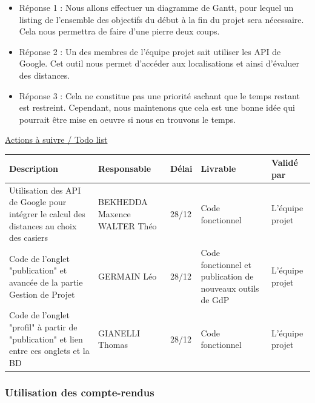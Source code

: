 \documentclass[11pt]{article}
\begin{document}
\begin{itemize}
	\item  Réponse 1 : Nous allons effectuer un diagramme de Gantt, pour lequel un listing de l'ensemble des objectifs du début à la fin du projet sera nécessaire. Cela nous permettra de faire d'une pierre deux coups.
    \item	Réponse 2 : Un des membres de l'équipe projet sait utiliser les API de Google. Cet outil nous permet d'accéder aux localisations et ainsi d'évaluer des distances. 
    \item	Réponse 3 : Cela ne constitue pas une priorité sachant que le temps restant est restreint. Cependant, nous maintenons que cela est une bonne idée qui pourrait être mise en oeuvre si nous en trouvons le temps.

\end{itemize}
\vspace{0.5cm}


\underline{Actions à suivre / Todo list}
\vspace{0.2cm}

\begin{center}
\begin{tabular}{|p{4cm}|p{4cm}|p{1cm}|p{3cm}|p{2cm}|}
\hline
\centering Description & 
\centering Responsable & 
\centering Délai & 
\centering Livrable & 
\hspace{0.05cm} Validé par\\
\hline
Utilisation des API de Google pour intégrer le calcul des distances au choix des casiers & BEKHEDDA Maxence \newline WALTER Théo & 28/12 & Code fonctionnel & L'équipe projet \\
\hline
Code de l'onglet "publication" et avancée de la partie Gestion de Projet & GERMAIN Léo & 28/12 & Code fonctionnel et publication de nouveaux outils de GdP & L'équipe projet\\
\hline
Code de l'onglet "profil" à partir de "publication" et lien entre ces onglets et la BD & GIANELLI Thomas & 28/12 & Code fonctionnel & L'équipe projet\\
\hline

	
\end{tabular}
\end{center}

\subsubsection{Utilisation des compte-rendus}
\end{document}
